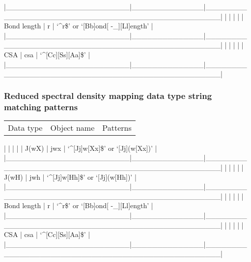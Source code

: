 |\_\_\_\_\_\_\_\_\_\_\_\_\_\_\_\_\_\_\_\_\_\_\_\_|\_\_\_\_\_\_\_\_\_\_\_\_\_\_|\_\_\_\_\_\_\_\_\_\_\_\_\_\_\_\_\_\_\_\_\_\_\_\_\_\_\_\_\_\_\_\_\_\_\_\_\_\_\_\_\_\_\_\_\_\_\_\_\_\_|
|                        |              |                                                  |
| Bond length            | r            | `\^{}r\$' or `[Bb]ond[ -\_][Ll]ength'                 |
|\_\_\_\_\_\_\_\_\_\_\_\_\_\_\_\_\_\_\_\_\_\_\_\_|\_\_\_\_\_\_\_\_\_\_\_\_\_\_|\_\_\_\_\_\_\_\_\_\_\_\_\_\_\_\_\_\_\_\_\_\_\_\_\_\_\_\_\_\_\_\_\_\_\_\_\_\_\_\_\_\_\_\_\_\_\_\_\_\_|
|                        |              |                                                  |
| CSA                    | csa          | `\^{}[Cc][Ss][Aa]\$'                                 |
|\_\_\_\_\_\_\_\_\_\_\_\_\_\_\_\_\_\_\_\_\_\_\_\_|\_\_\_\_\_\_\_\_\_\_\_\_\_\_|\_\_\_\_\_\_\_\_\_\_\_\_\_\_\_\_\_\_\_\_\_\_\_\_\_\_\_\_\_\_\_\_\_\_\_\_\_\_\_\_\_\_\_\_\_\_\_\_\_\_|




\subsubsection{Reduced spectral density mapping data type string matching patterns}



\begin{tabular}{ccc}
Data type & Object name & Patterns \\
\end{tabular}
|                        |              |                                                  |
| J(wX)                  | jwx          | `\^{}[Jj]w[Xx]\$' or `[Jj](w[Xx])'                   |
|\_\_\_\_\_\_\_\_\_\_\_\_\_\_\_\_\_\_\_\_\_\_\_\_|\_\_\_\_\_\_\_\_\_\_\_\_\_\_|\_\_\_\_\_\_\_\_\_\_\_\_\_\_\_\_\_\_\_\_\_\_\_\_\_\_\_\_\_\_\_\_\_\_\_\_\_\_\_\_\_\_\_\_\_\_\_\_\_\_|
|                        |              |                                                  |
| J(wH)                  | jwh          | `\^{}[Jj]w[Hh]\$' or `[Jj](w[Hh])'                   |
|\_\_\_\_\_\_\_\_\_\_\_\_\_\_\_\_\_\_\_\_\_\_\_\_|\_\_\_\_\_\_\_\_\_\_\_\_\_\_|\_\_\_\_\_\_\_\_\_\_\_\_\_\_\_\_\_\_\_\_\_\_\_\_\_\_\_\_\_\_\_\_\_\_\_\_\_\_\_\_\_\_\_\_\_\_\_\_\_\_|
|                        |              |                                                  |
| Bond length            | r            | `\^{}r\$' or `[Bb]ond[ -\_][Ll]ength'                 |
|\_\_\_\_\_\_\_\_\_\_\_\_\_\_\_\_\_\_\_\_\_\_\_\_|\_\_\_\_\_\_\_\_\_\_\_\_\_\_|\_\_\_\_\_\_\_\_\_\_\_\_\_\_\_\_\_\_\_\_\_\_\_\_\_\_\_\_\_\_\_\_\_\_\_\_\_\_\_\_\_\_\_\_\_\_\_\_\_\_|
|                        |              |                                                  |
| CSA                    | csa          | `\^{}[Cc][Ss][Aa]\$'                                 |
|\_\_\_\_\_\_\_\_\_\_\_\_\_\_\_\_\_\_\_\_\_\_\_\_|\_\_\_\_\_\_\_\_\_\_\_\_\_\_|\_\_\_\_\_\_\_\_\_\_\_\_\_\_\_\_\_\_\_\_\_\_\_\_\_\_\_\_\_\_\_\_\_\_\_\_\_\_\_\_\_\_\_\_\_\_\_\_\_\_|




